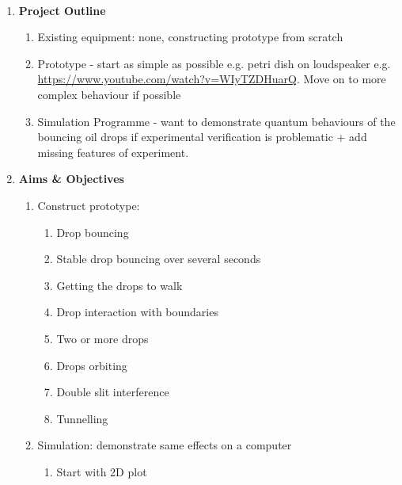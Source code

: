 \noindent 
\\
\begin{enumerate}
\item  \textbf{Project Outline}

\begin{enumerate}
\item \textbf{ }Existing equipment: none, constructing prototype from scratch

\item  Prototype - start as simple as possible e.g. petri dish on loudspeaker e.g. \url{https://www.youtube.com/watch?v=WIyTZDHuarQ}.  Move on to more complex behaviour if possible

\item  Simulation Programme - want to demonstrate quantum behaviours of the bouncing oil drops if experimental verification is problematic + add missing features of experiment.\\
\end{enumerate}

\item  \textbf{Aims \& Objectives}

\begin{enumerate}
\item \textbf{ }Construct prototype:

\begin{enumerate}
\item  Drop bouncing

\item  Stable drop bouncing over several seconds

\item  Getting the drops to walk

\item  Drop interaction with boundaries

\item  Two or more drops

\item  Drops orbiting

\item  Double slit interference

\item  Tunnelling
\end{enumerate}

\item  Simulation: demonstrate same effects on a computer

\begin{enumerate}
\item  Start with 2D plot


\end{enumerate}
\end{enumerate}
\end{enumerate}
